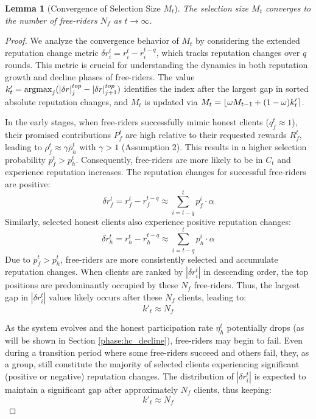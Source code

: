 \documentclass[conference]{IEEEtran}
\newtheorem{lemma}{Lemma}
\newcommand{\argmax}{\operatornamewithlimits{argmax}}
\DeclarePairedDelimiter{\abs}{\lvert}{\rvert}
\DeclarePairedDelimiter{\round}{\lfloor}{\rceil}
\begin{document}
\begin{lemma}[Convergence of Selection Size $M_t$]
\label{lemma:mt_convergence}
The selection size $M_t$ converges to the number of free-riders $N_f$ as $t \to \infty$.
\end{lemma}
\begin{proof}
We analyze the convergence behavior of $M_t$ by considering the extended reputation change metric $\delta r_i^t = r_i^t - r_i^{t-q}$, which tracks reputation changes over $q$ rounds. This metric is crucial for understanding the dynamics in both reputation growth and decline phases of free-riders. The value $k'_t = \argmax_j (\abs{\delta r}_j^{top} - \abs{\delta r}_{j+1}^{top})$ identifies the index after the largest gap in sorted absolute reputation changes, and $M_t$ is updated via $M_t = \round{\omega M_{t-1} + (1-\omega) k'_t}$.

In the early stages, when free-riders successfully mimic honest clients ($q_f^t \approx 1$), their promised contributions $P_f^t$ are high relative to their requested rewards $R_f^t$, leading to $\rho_f^t \approx \gamma \bar{\rho}_h^t$ with $\gamma > 1$ (Assumption 2). This results in a higher selection probability $p_f^t > p_h^t$. Consequently, free-riders are more likely to be in $C_t$ and experience reputation increases. The reputation changes for successful free-riders are positive:
\begin{equation}
    \delta r_f^t = r_f^t - r_f^{t-q} \approx \sum_{i=t-q}^t p_f^i \cdot \alpha
\end{equation}
Similarly, selected honest clients also experience positive reputation changes:
\begin{equation}
    \delta r_h^t = r_h^t - r_h^{t-q} \approx \sum_{i=t-q}^t p_h^i \cdot \alpha
\end{equation}
Due to $p_f^t > p_h^t$, free-riders are more consistently selected and accumulate reputation changes. When clients are ranked by $|\delta r_i^t|$ in descending order, the top positions are predominantly occupied by these $N_f$ free-riders. Thus, the largest gap in $|\delta r_i^t|$ values likely occurs after these $N_f$ clients, leading to:
\begin{equation}
    k'_t \approx N_f
\end{equation}

As the system evolves and the honest participation rate $\eta_h^t$ potentially drops (as will be shown in Section \ref{phase:hc_decline}), free-riders may begin to fail. Even during a transition period where some free-riders succeed and others fail, they, as a group, still constitute the majority of selected clients experiencing significant (positive or negative) reputation changes. The distribution of $|\delta r_i^t|$ is expected to maintain a significant gap after approximately $N_f$ clients, thus keeping:
\begin{equation}
    k'_t \approx N_f
\end{equation}


\end{proof}
\end{document}
